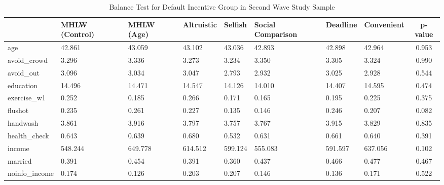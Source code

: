 \begin{table}[!h]

\caption{Balance Test for Default Incentive Group in Second Wave Study Sample \label{tab:act-coupon1-balance}}
\centering
\fontsize{9}{11}\selectfont
\begin{threeparttable}
\begin{tabular}[t]{l>{\centering\arraybackslash}p{3em}>{\centering\arraybackslash}p{3em}>{\centering\arraybackslash}p{3em}>{\centering\arraybackslash}p{3em}>{\centering\arraybackslash}p{3em}>{\centering\arraybackslash}p{3em}>{\centering\arraybackslash}p{3em}c}
\toprule
  & MHLW (Control) & MHLW (Age) & Altruistic & Selfish & Social Comparison & Deadline & Convenient & p-value\\
\midrule
age & \num{42.861} & \num{43.059} & \num{43.102} & \num{43.036} & \num{42.893} & \num{42.898} & \num{42.964} & \num{0.953}\\
avoid\_crowd & \num{3.296} & \num{3.336} & \num{3.273} & \num{3.234} & \num{3.350} & \num{3.305} & \num{3.324} & \num{0.990}\\
avoid\_out & \num{3.096} & \num{3.034} & \num{3.047} & \num{2.793} & \num{2.932} & \num{3.025} & \num{2.928} & \num{0.544}\\
education & \num{14.496} & \num{14.471} & \num{14.547} & \num{14.126} & \num{14.010} & \num{14.407} & \num{14.595} & \num{0.474}\\
exercise\_w1 & \num{0.252} & \num{0.185} & \num{0.266} & \num{0.171} & \num{0.165} & \num{0.195} & \num{0.225} & \num{0.375}\\
flushot & \num{0.235} & \num{0.261} & \num{0.227} & \num{0.135} & \num{0.146} & \num{0.246} & \num{0.207} & \num{0.082}\\
handwash & \num{3.861} & \num{3.916} & \num{3.797} & \num{3.757} & \num{3.767} & \num{3.915} & \num{3.829} & \num{0.835}\\
health\_check & \num{0.643} & \num{0.639} & \num{0.680} & \num{0.532} & \num{0.631} & \num{0.661} & \num{0.640} & \num{0.391}\\
income & \num{548.244} & \num{649.778} & \num{614.512} & \num{599.124} & \num{555.083} & \num{591.597} & \num{637.056} & \num{0.102}\\
married & \num{0.391} & \num{0.454} & \num{0.391} & \num{0.360} & \num{0.437} & \num{0.466} & \num{0.477} & \num{0.467}\\
noinfo\_income & \num{0.174} & \num{0.126} & \num{0.203} & \num{0.207} & \num{0.146} & \num{0.136} & \num{0.171} & \num{0.522}\\

\end{tabular}
\end{threeparttable}
\end{table}
